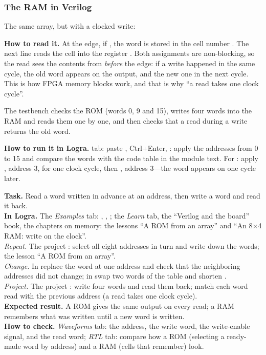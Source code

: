 \subsubsection*{The RAM in Verilog}

The same array, but with a clocked write:


\textbf{How to read it.} At the edge, if , the word  is stored
in the cell number . The next line reads the cell into the register
. Both assignments are non-blocking, so the read sees the contents
from \emph{before} the edge: if a write happened in the same cycle, the old word
appears on the output, and the new one in the next cycle. This is how FPGA memory
blocks work, and that is why ``a read takes one clock cycle''.

The testbench  checks the ROM (words 0, 9 and 15), writes four
words into the RAM and reads them one by one, and then checks that a read during
a write returns the old word.

\textbf{How to run it in Logra.}  tab: paste ,
Ctrl+Enter, : apply the addresses from 0 to 15 and compare the
words with the code table in the module text. For : apply
, address 3,  for one clock cycle, then ,
address 3---the word  appears on  one cycle later.

\begin{diybox}
\textbf{Task.} Read a word written in advance at an address, then write a word
and read it back.\\
\textbf{In Logra.} The \emph{Examples} tab: ,
, ; the \emph{Learn} tab, the ``Verilog
and the board'' book, the chapters on memory: the lessons ``A ROM from an
array'' and ``An 8×4 RAM: write on the clock''.\\
 \emph{Repeat.} The project : select all eight
addresses in turn and write down the words; the lesson ``A ROM from an
array''.\\
 \emph{Change.} In  replace the word at one address and
check that the neighboring addresses did not change; in  swap
two words of the table and shorten .\\
 \emph{Project.} The project : write four
words and read them back; match each word read with the previous
address (a read takes one clock cycle).\\
\textbf{Expected result.} A ROM gives the same output on every read;
a RAM remembers what was written until a new word is written.\\
\textbf{How to check.} \emph{Waveforms} tab: the address, the write word, the
write-enable signal, and the read word; \emph{RTL} tab: compare how a ROM
(selecting a ready-made word by address) and a RAM (cells that remember) look.
\end{diybox}

